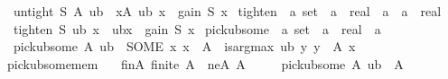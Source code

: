\begin{isabellebody}
\ \ {\isachardoublequoteopen}untight\ S\ A\ ub\ {\isacharequal}{\kern0pt}\ {\isacharbraceleft}{\kern0pt}x{\isasymin}A{\isachardot}{\kern0pt}\ ub\ x\ {\isachargreater}{\kern0pt}\ gain\ S\ x{\isacharbraceright}{\kern0pt}{\isachardoublequoteclose}\isanewline
\isanewline
{}\isamarkupfalse%
\ tighten\ {\isacharcolon}{\kern0pt}{\isacharcolon}{\kern0pt}\ {\isachardoublequoteopen}{\isacharprime}{\kern0pt}a\ set\ {\isasymRightarrow}\ {\isacharparenleft}{\kern0pt}{\isacharprime}{\kern0pt}a\ {\isasymRightarrow}\ real{\isacharparenright}{\kern0pt}\ {\isasymRightarrow}\ {\isacharprime}{\kern0pt}a\ {\isasymRightarrow}\ {\isacharparenleft}{\kern0pt}{\isacharprime}{\kern0pt}a\ {\isasymRightarrow}\ real{\isacharparenright}{\kern0pt}{\isachardoublequoteclose}\ \isanewline
\ \ {\isachardoublequoteopen}tighten\ S\ ub\ x\ {\isacharequal}{\kern0pt}\ ub{\isacharparenleft}{\kern0pt}x\ {\isacharcolon}{\kern0pt}{\isacharequal}{\kern0pt}\ gain\ S\ x{\isacharparenright}{\kern0pt}{\isachardoublequoteclose}\isanewline
\isanewline
{}\isamarkupfalse%
\ pick{\isacharunderscore}{\kern0pt}ub{\isacharunderscore}{\kern0pt}some\ {\isacharcolon}{\kern0pt}{\isacharcolon}{\kern0pt}\ {\isachardoublequoteopen}{\isacharprime}{\kern0pt}a\ set\ {\isasymRightarrow}\ {\isacharparenleft}{\kern0pt}{\isacharprime}{\kern0pt}a\ {\isasymRightarrow}\ real{\isacharparenright}{\kern0pt}\ {\isasymRightarrow}\ {\isacharprime}{\kern0pt}a{\isachardoublequoteclose}\ \isanewline
\ \ {\isachardoublequoteopen}pick{\isacharunderscore}{\kern0pt}ub{\isacharunderscore}{\kern0pt}some\ A\ ub\ {\isacharequal}{\kern0pt}\ {\isacharparenleft}{\kern0pt}SOME\ x{\isachardot}{\kern0pt}\ x\ {\isasymin}\ A\ {\isasymand}\ is{\isacharunderscore}{\kern0pt}arg{\isacharunderscore}{\kern0pt}max\ ub\ {\isacharparenleft}{\kern0pt}{\isasymlambda}y{\isachardot}{\kern0pt}\ y\ {\isasymin}\ A{\isacharparenright}{\kern0pt}\ x{\isacharparenright}{\kern0pt}{\isachardoublequoteclose}\isanewline
\isanewline
{}\isamarkupfalse%
\ pick{\isacharunderscore}{\kern0pt}ub{\isacharunderscore}{\kern0pt}some{\isacharunderscore}{\kern0pt}mem{\isacharcolon}{\kern0pt}\isanewline
\ \ \ finA{\isacharcolon}{\kern0pt}\ {\isachardoublequoteopen}finite\ A{\isachardoublequoteclose}\ \ neA{\isacharcolon}{\kern0pt}\ {\isachardoublequoteopen}A\ {\isasymnoteq}\ {\isacharbraceleft}{\kern0pt}{\isacharbraceright}{\kern0pt}{\isachardoublequoteclose}\isanewline
\ \ \ {\isachardoublequoteopen}pick{\isacharunderscore}{\kern0pt}ub{\isacharunderscore}{\kern0pt}some\ A\ ub\ {\isasymin}\ A{\isachardoublequoteclose}\isanewline

\end{isabellebody}
